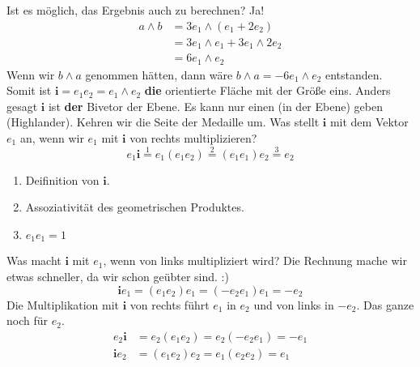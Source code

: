 \documentclass[fleqn]{scrartcl}
\numberwithin{equation}{section}
\def\*#1{\mathbf{#1}}
\begin{document}
Ist es möglich, das Ergebnis auch zu berechnen? Ja!
\begin{align*}
    a\wedge b &= 3e_1\wedge(e_1+2e_2) \\
    &= 3e_1\wedge e_1 + 3e_1\wedge 2e_2 \\
    &=6 e_1\wedge e_2
\end{align*}
Wenn wir $b\wedge a$ genommen hätten, dann wäre $b\wedge a = -6e_1\wedge e_2$
entstanden. Somit ist $\*i=e_1e_2=e_1\wedge e_2$ \textbf{die} orientierte
Fläche mit der Größe eins. Anders gesagt $\*i$ ist \textbf{der} Bivetor der
Ebene. Es kann nur einen (in der Ebene) geben (Highlander).
\newpage
Kehren wir die Seite der Medaille um. Was stellt $\*i$ mit dem Vektor $e_1$
an, wenn wir $e_1$ mit $\*i$ von rechts multiplizieren?
\[e_1\*i\stackrel{1}=e_1(e_1e_2)\stackrel{2}=(e_1e_1)e_2\stackrel{3}=e_2\]
\begin{enumerate}
    \item Deifinition von $\*i$.
    \item Assoziativität des geometrischen Produktes.
    \item $e_1e_1=1$
\end{enumerate}
Was macht $\*i$ mit $e_1$, wenn von links multipliziert wird? Die Rechnung
mache wir etwas schneller, da wir schon geübter sind. :)
\[\*ie_1=(e_1e_2)e_1=(-e_2e_1)e_1=-e_2\]
Die Multiplikation mit $\*i$ von rechts führt $e_1$ in $e_2$ und von links in
$-e_2$. Das ganze noch für $e_2$.
\begin{align*}
    e_2\*i &= e_2(e_1e_2) = e_2(-e_2e_1) = -e_1 \\
    \*ie_2 &= (e_1e_2)e_2 = e_1(e_2e_2) = e_1
\end{align*}
\end{document}
